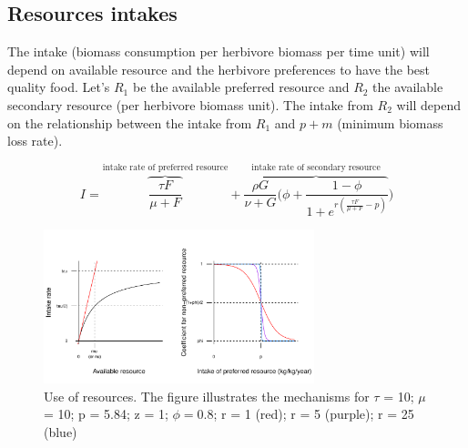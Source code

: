 \subsection{Resources intakes}

The intake (biomass consumption per herbivore biomass per time unit) will
depend on available resource and the herbivore preferences to have the best
quality food. Let's $R_1$ be the available preferred resource and $R_2$ the
available secondary resource (per herbivore biomass unit). The intake from
$R_2$ will depend on the relationship between the intake from $R_1$ and $p+m$
(minimum biomass loss rate).

\[
I = \overbrace{\frac{\tau F}{\mu+F}}^\text{intake rate of preferred resource} 
+ \overbrace{\frac{\rho G}{\nu+G}\Big(\phi + \frac{1-\phi}{ 1+e^{r(\frac{\tau F}{\mu+F} - p)}}}^\text{intake rate of secondary resource} \Big)
\]



\begin{figure}
\includegraphics[width=0.7\textwidth]{../graphs/intakes.pdf}
   
   \caption{Use of resources. The figure illustrates the mechanisms for $\tau$ = 10; $\mu$ = 10; p = 5.84; z = 1; $\phi=0.8$; r = 1 (red); r = 5 (purple); r = 25 (blue)}
\label{resources}
\end{figure}

